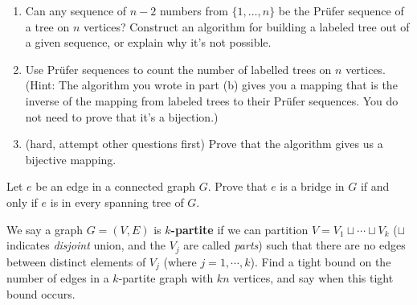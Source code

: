 \begin{enumerate}
\begin{enumerate}

\hfill
                
        \item Can any sequence of $n-2$ numbers from $\{1, \dots, n\}$ be the Pr{\"u}fer sequence of a tree on $n$ vertices? Construct an algorithm for building a labeled tree out of a given sequence, or explain why it's not possible. 

        \item Use Pr{\"u}fer sequences to count the number of labelled trees on $n$ vertices. (Hint: The algorithm you wrote in part (b) gives you a mapping that is the inverse of the mapping from labeled trees to their Pr{\"u}fer sequences. You do not need to prove that it's a bijection.)

        \item (hard, attempt other questions first) Prove that the algorithm gives us a bijective mapping. 
    \end{enumerate}
    
    
     Let $e$ be an edge in a connected graph $G$. Prove that $e$ is a bridge in $G$ if and only if $e$ is in every spanning tree of $G$.

     We say a graph $G=(V,E)$ is \textbf{$k$-partite} if we can partition $V = V_1 \sqcup \cdots \sqcup V_k$ ($\sqcup$ indicates \textit{disjoint} union, and the $V_j$ are called \textit{parts}) such that there are no edges between distinct elements of $V_j$ (where $j = 1, \cdots, k$). Find a tight bound on the number of edges in a $k$-partite graph with $kn$ vertices, and say when this tight bound occurs.
\end{enumerate}